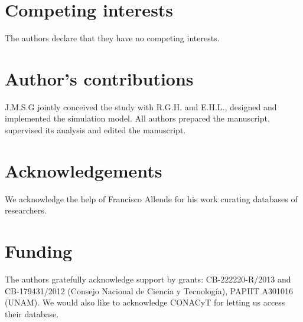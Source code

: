 \documentclass{bmcart}
\begin{document}

\begin{backmatter}

\section*{Competing interests}
  The authors declare that they have no competing interests.

\section*{Author's contributions}
    J.M.S.G jointly conceived the study with  R.G.H. and E.H.L., designed and
    implemented the simulation model. All authors prepared the manuscript,
    supervised its analysis and edited the manuscript. 

\section*{Acknowledgements}
    We acknowledge the help of Francisco Allende for his work curating 
databases of researchers.

\section*{Funding}
  The authors gratefully acknowledge support by grants: CB-222220-R/2013 and
CB-179431/2012 (Consejo Nacional de Ciencia y Tecnolog\'ia), PAPIIT A301016 (UNAM). We would also like
to acknowledge CONACyT for letting us access their database.


\end{backmatter}
\end{document}

